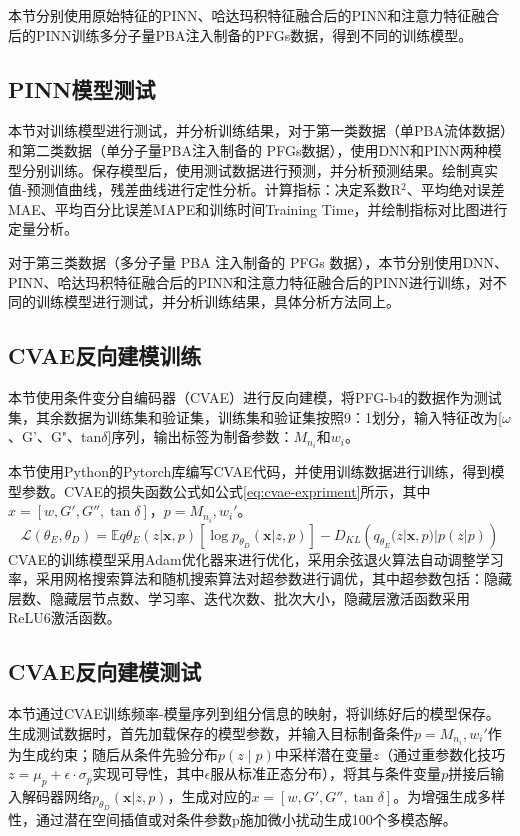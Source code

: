 本节分别使用原始特征的PINN、哈达玛积特征融合后的PINN和注意力特征融合后的PINN训练多分子量PBA注入制备的PFGs数据，得到不同的训练模型。

\subsection{PINN模型测试}
本节对训练模型进行测试，并分析训练结果，对于第一类数据（单PBA流体数据）和第二类数据（单分子量PBA注入制备的 PFGs数据），使用DNN和PINN两种模型分别训练。保存模型后，使用测试数据进行预测，并分析预测结果。绘制真实值-预测值曲线，残差曲线进行定性分析。计算指标：决定系数R$^2$、平均绝对误差MAE、平均百分比误差MAPE和训练时间Training Time，并绘制指标对比图进行定量分析。

对于第三类数据（多分子量 PBA 注入制备的 PFGs 数据），本节分别使用DNN、PINN、哈达玛积特征融合后的PINN和注意力特征融合后的PINN进行训练，对不同的训练模型进行测试，并分析训练结果，具体分析方法同上。

\subsection{CVAE反向建模训练}
本节使用条件变分自编码器（CVAE）进行反向建模，将PFG-b4的数据作为测试集，其余数据为训练集和验证集，训练集和验证集按照9：1划分，输入特征改为[$\omega$、G'、G"、tan$\delta$]序列，输出标签为制备参数：$M_{n_i}$和$w_i$。

本节使用Python的Pytorch库编写CVAE代码，并使用训练数据进行训练，得到模型参数。CVAE的损失函数公式如公式\eqref{eq:cvae-expriment}所示，其中$x = [w, G', G'', \tan \delta]$，$p = { M_{n_i}, w_i }'$。
\begin{equation}
  \mathcal{L}(\theta_E, \theta_D) = \mathbb{E}{q{\theta_E}(z|\mathbf{x},p)} \left[ \log p_{\theta_D}(\mathbf{x}|z,p) \right] - D_{KL}\left(q_{\theta_E}(z|\mathbf{x},p) | p(z|p)\right) \label{eq:cvae-expriment}
\end{equation}
CVAE的训练模型采用Adam优化器来进行优化，采用余弦退火算法自动调整学习率，采用网格搜索算法和随机搜索算法对超参数进行调优，其中超参数包括：隐藏层数、隐藏层节点数、学习率、迭代次数、批次大小，隐藏层激活函数采用ReLU6激活函数。
\subsection{CVAE反向建模测试}
本节通过CVAE训练频率-模量序列到组分信息的映射，将训练好后的模型保存。生成测试数据时，首先加载保存的模型参数，并输入目标制备条件$p = { M_{n_i}, w_i }'$作为生成约束；随后从条件先验分布$p(z∣p)$中采样潜在变量$z$（通过重参数化技巧$z=\mu_p+\epsilon⋅\sigma_p$实现可导性，其中$\epsilon$服从标准正态分布），将其与条件变量$p$拼接后输入解码器网络$p_{\theta_D}(\mathbf{x}|z,p)$，生成对应的$x = [w, G', G'', \tan \delta]$。为增强生成多样性，通过潜在空间插值或对条件参数p施加微小扰动生成100个多模态解。

